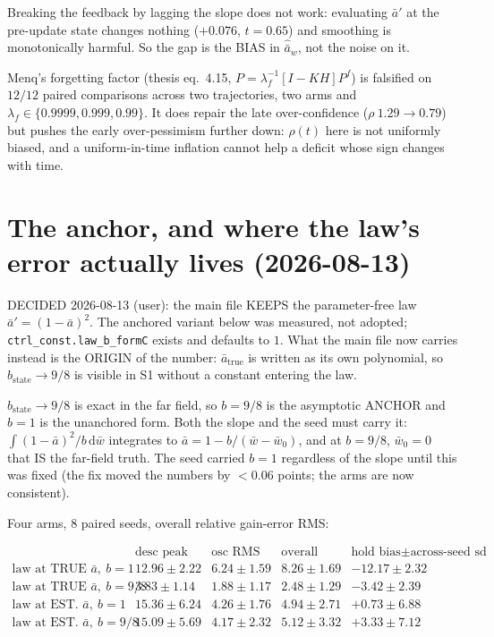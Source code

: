 \documentclass[11pt,a4paper,fontset=none]{ctexart}
\newcommand{\ba}{\bar{a}}
\newcommand{\bw}{\bar{w}}
\begin{document}
Breaking the feedback by lagging the slope does not work: evaluating $\ba'$ at
the pre-update state changes nothing ($+0.076$, $t = 0.65$) and smoothing is
monotonically harmful. So the gap is the BIAS in $\hat{\ba}_w$, not the noise on
it.

Menq's forgetting factor (thesis eq.\ 4.15,
$P = \lambda_f^{-1}[I-KH]P^f$) is falsified on $12/12$ paired comparisons across
two trajectories, two arms and $\lambda_f \in \{0.9999, 0.999, 0.99\}$. It does
repair the late over-confidence ($\rho\ 1.29 \to 0.79$) but pushes the early
over-pessimism further down: $\rho(t)$ here is not uniformly biased, and a
uniform-in-time inflation cannot help a deficit whose sign changes with time.


\section*{The anchor, and where the law's error actually lives (2026-08-13)}

DECIDED 2026-08-13 (user): the main file KEEPS the parameter-free law
$\ba' = (1-\ba)^{2}$. The anchored variant below was measured, not adopted;
\texttt{ctrl\_const.law\_b\_formC} exists and defaults to $1$. What the main
file now carries instead is the ORIGIN of the number: $\ba_{\mathrm{true}}$ is
written as its own polynomial, so $b_{\mathrm{state}} \to 9/8$ is visible in S1
without a constant entering the law.

$b_{\mathrm{state}} \to 9/8$ is exact in the far field, so $b = 9/8$ is the
asymptotic ANCHOR and $b = 1$ is the unanchored form. Both the slope and the
seed must carry it: $\int (1-\ba)^{2}/b\,\mathrm{d}\bw$ integrates to
$\ba = 1 - b/(\bw-\bw_0)$, and at $b = 9/8$, $\bw_0 = 0$ that IS the far-field
truth. The seed carried $b = 1$ regardless of the slope until this was fixed
(the fix moved the numbers by $< 0.06$ points; the arms are now consistent).

Four arms, 8 paired seeds, overall relative gain-error RMS:

\begin{equation*}
\begin{array}{lcccc}
 & \text{desc peak} & \text{osc RMS} & \text{overall} & \text{hold bias} \pm \text{across-seed sd} \\[0.2em]
\text{law at TRUE }\ba,\ b=1     & 12.96\pm2.22 & 6.24\pm1.59 & 8.26\pm1.69 & -12.17 \pm 2.32 \\
\text{law at TRUE }\ba,\ b=9/8   & 3.83\pm1.14  & 1.88\pm1.17 & 2.48\pm1.29 & -3.42 \pm 2.39 \\
\text{law at EST. }\ba,\ b=1     & 15.36\pm6.24 & 4.26\pm1.76 & 4.94\pm2.71 & +0.73 \pm 6.88 \\
\text{law at EST. }\ba,\ b=9/8   & 15.09\pm5.69 & 4.17\pm2.32 & 5.12\pm3.32 & +3.33 \pm 7.12
\end{array}
\end{equation*}
\end{document}
